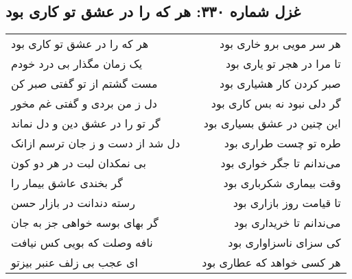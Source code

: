 \begin{center}
\section*{غزل شماره ۳۳۰: هر که را در عشق تو کاری بود}
\label{sec:330}
\begin{longtable}{l p{0.5cm} r}
هر که را در عشق تو کاری بود
&&
هر سر مویی برو خاری بود
\\
یک زمان مگذار بی درد خودم
&&
تا مرا در هجر تو یاری بود
\\
مست گشتم از تو گفتی صبر کن
&&
صبر کردن کار هشیاری بود
\\
دل ز من بردی و گفتی غم مخور
&&
گر دلی نبود نه بس کاری بود
\\
گر تو را در عشق دین و دل نماند
&&
این چنین در عشق بسیاری بود
\\
دل شد از دست و ز جان ترسم ازانک
&&
طره تو چست طراری بود
\\
بی نمکدان لبت در هر دو کون
&&
می‌ندانم تا جگر خواری بود
\\
گر بخندی عاشق بیمار را
&&
وقت بیماری شکرباری بود
\\
رسته دندانت در بازار حسن
&&
تا قیامت روز بازاری بود
\\
گر بهای بوسه خواهی جز به جان
&&
می‌ندانم تا خریداری بود
\\
نافه وصلت که بویی کس نیافت
&&
کی سزای ناسزاواری بود
\\
ای عجب بی زلف عنبر بیزتو
&&
هر کسی خواهد که عطاری بود
\\
\end{longtable}
\end{center}
